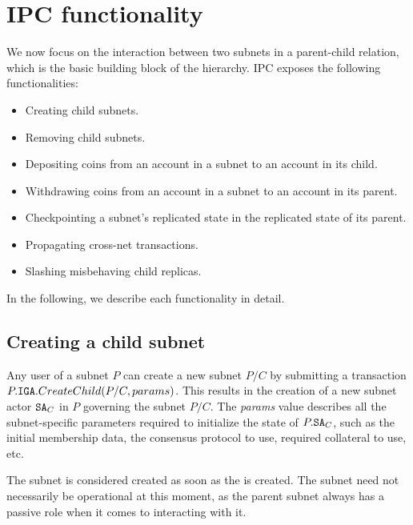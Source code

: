 \section{IPC functionality}
\label{sec:functionality}

We now focus on the interaction between two subnets in a parent-child relation, which is the basic building block of the \ipc hierarchy.
IPC exposes the following functionalities:
\begin{itemize}
    \item Creating child subnets.
    \item Removing child subnets.
    \item Depositing coins from an account in a subnet to an account in its child.
    \item Withdrawing coins from an account in a subnet to an account in its parent.
    \item Checkpointing a subnet's replicated state in the replicated state of its parent.
    \item Propagating cross-net transactions.
    \item Slashing misbehaving child replicas.
\end{itemize}
In the following, we describe each functionality in detail.

\subsection{Creating a child subnet}
\label{sec:create}

Any user of a subnet $P$ can create a new subnet $P/C$ by submitting a transaction $P.\texttt{IGA}.CreateChild(P/C, params)$.
This results in the creation of a new subnet actor $\texttt{SA}_C$ in $P$ governing the subnet $P/C$.
The \emph{params} value describes all the subnet-specific parameters required to initialize the state of $P.\texttt{SA}_C$,
such as the initial membership data, the consensus protocol to use, required collateral to use, etc.

The subnet is considered created as soon as the \sa is created.
The subnet need not necessarily be operational at this moment,
as the parent subnet always has a passive role when it comes to interacting with it.


